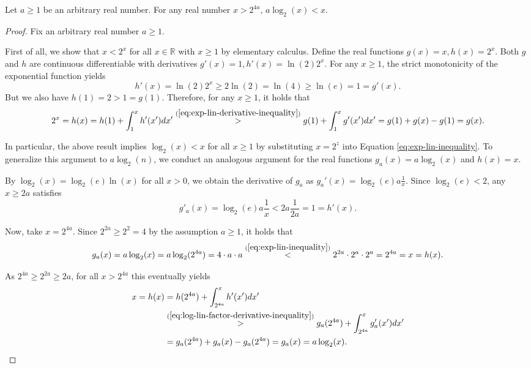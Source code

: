 \begin{lemma}
	\label{lemma:log-lin-inequality}
	Let $a\geq 1$ be an arbitrary real number.
	For any real number $x> 2^{4a}$, $a\log_2(x)< x$.
\end{lemma}
\begin{proof}
	Fix an arbitrary real number $a\geq 1$.
	
	First of all, we show that $x<2^x$ for all $x\in\mathbb{R}$ with $x\geq 1$ by elementary calculus.
	Define the real functions $g(x)=x,h(x)=2^x$.
	Both $g$ and $h$ are continuous differentiable with derivatives $g'(x)=1,h'(x)=\ln(2)2^x$.
	For any $x\geq 1$, the strict monotonicity of the exponential function yields
	\begin{equation}
		\label{eq:exp-lin-derivative-inequality}
		h'(x)=\ln(2)2^x\geq 2\ln(2)=\ln(4)\geq \ln(e)=1=g'(x).
	\end{equation}
	But we also have $h(1)=2>1=g(1)$.
	Therefore, for any $x\geq 1$, it holds that
	\begin{equation}
		\label{eq:exp-lin-inequality}
		2^x=h(x)=h(1)+\int_{1}^{x}h'(x')dx'\overset{(\ref{eq:exp-lin-derivative-inequality})}{>} g(1)+\int_{1}^{x}g'(x')dx'=g(1)+g(x)-g(1)=g(x).
	\end{equation}
	
	In particular, the above result implies $\log_2(x)< x$ for all $x\geq 1$ by substituting $x=2^z$ into Equation \ref{eq:exp-lin-inequality}.
	To generalize this argument to $a\log_2(n)$, we conduct an analogous argument for the real functions $g_a(x)=a\log_2(x)$ and $h(x)=x$.
	
	By $\log_2(x)=\log_2(e)\ln(x)$ for all $x>0$, we obtain the derivative of $g_a$ as $g_a'(x)=\log_2(e)a\frac{1}{x}$.
	Since $\log_2(e) < 2$, any $x\geq 2a$ satisfies
	\begin{equation}
		\label{eq:log-lin-factor-derivative-inequality}
		g'_a(x)=\log_2(e)a\frac{1}{x}< 2a\frac{1}{2a}=1=h'(x).
	\end{equation}
	
	Now, take $x=2^{4a}$. Since $2^{2a} \geq 2^2 = 4$ by the assumption $a\geq 1$, it holds that
	\begin{equation}
		\label{eq:log-lin-factor-inequality-init}
		g_a(x)=a\log_2(x)=a\log_2(2^{4a})=4\cdot a \cdot a \overset{(\ref{eq:exp-lin-inequality})}{<}2^{2a}\cdot 2^a\cdot 2^a=2^{4a}=x=h(x).
	\end{equation}
	
	As $2^{4a}\geq 2^{2a}\geq 2a$, for all $x> 2^{4a}$ this eventually yields
	\begin{align}
		\label{eq:log-lin-inequality}
		x=h(x)&=h(2^{4a})+\int_{2^{4a}}^{x}h'(x')dx'\\
		&\overset{(\ref{eq:log-lin-factor-derivative-inequality})}{>} g_a(2^{4a})+\int_{2^{4a}}^{x}g_a'(x')dx'\\
		&=g_a(2^{4a})+g_a(x)-g_a(2^{4a})=g_a(x)=a\log_2(x).
	\end{align}
\end{proof}

